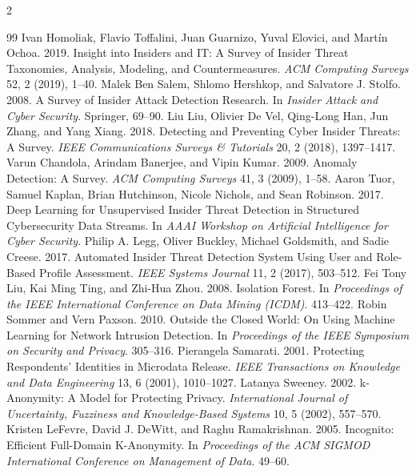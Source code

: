 \documentclass[10pt,a4paper]{article}
\begin{document}
\begin{multicols}{2}
\begin{thebibliography}{99}
\footnotesize\linespread{0.90}\selectfont
\setlength{\itemsep}{0pt}\setlength{\parskip}{0pt}
 Ivan Homoliak, Flavio Toffalini, Juan Guarnizo, Yuval Elovici, and Mart\'in Ochoa. 2019. Insight into Insiders and IT: A Survey of Insider Threat Taxonomies, Analysis, Modeling, and Countermeasures. \textit{ACM Computing Surveys} 52, 2 (2019), 1--40.
 Malek Ben Salem, Shlomo Hershkop, and Salvatore J. Stolfo. 2008. A Survey of Insider Attack Detection Research. In \textit{Insider Attack and Cyber Security}. Springer, 69--90.
 Liu Liu, Olivier De Vel, Qing-Long Han, Jun Zhang, and Yang Xiang. 2018. Detecting and Preventing Cyber Insider Threats: A Survey. \textit{IEEE Communications Surveys \& Tutorials} 20, 2 (2018), 1397--1417.
 Varun Chandola, Arindam Banerjee, and Vipin Kumar. 2009. Anomaly Detection: A Survey. \textit{ACM Computing Surveys} 41, 3 (2009), 1--58.
 Aaron Tuor, Samuel Kaplan, Brian Hutchinson, Nicole Nichols, and Sean Robinson. 2017. Deep Learning for Unsupervised Insider Threat Detection in Structured Cybersecurity Data Streams. In \textit{AAAI Workshop on Artificial Intelligence for Cyber Security}.
 Philip A. Legg, Oliver Buckley, Michael Goldsmith, and Sadie Creese. 2017. Automated Insider Threat Detection System Using User and Role-Based Profile Assessment. \textit{IEEE Systems Journal} 11, 2 (2017), 503--512.
 Fei Tony Liu, Kai Ming Ting, and Zhi-Hua Zhou. 2008. Isolation Forest. In \textit{Proceedings of the IEEE International Conference on Data Mining (ICDM)}. 413--422.
 Robin Sommer and Vern Paxson. 2010. Outside the Closed World: On Using Machine Learning for Network Intrusion Detection. In \textit{Proceedings of the IEEE Symposium on Security and Privacy}. 305--316.
 Pierangela Samarati. 2001. Protecting Respondents' Identities in Microdata Release. \textit{IEEE Transactions on Knowledge and Data Engineering} 13, 6 (2001), 1010--1027.
 Latanya Sweeney. 2002. k-Anonymity: A Model for Protecting Privacy. \textit{International Journal of Uncertainty, Fuzziness and Knowledge-Based Systems} 10, 5 (2002), 557--570.
 Kristen LeFevre, David J. DeWitt, and Raghu Ramakrishnan. 2005. Incognito: Efficient Full-Domain K-Anonymity. In \textit{Proceedings of the ACM SIGMOD International Conference on Management of Data}. 49--60.

\end{thebibliography}
\end{multicols}
\end{document}
